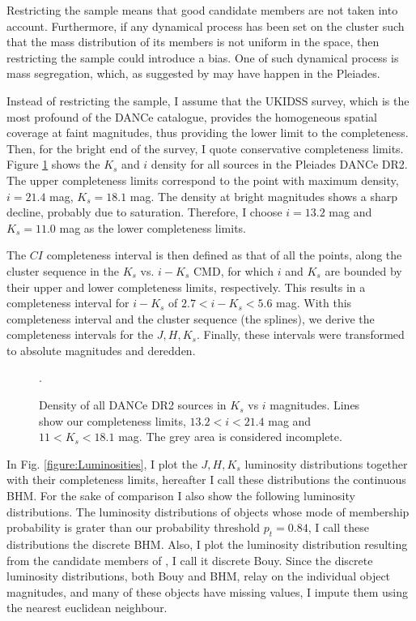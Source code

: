 Restricting the sample means that good candidate members are not taken into account. Furthermore, if any dynamical process has been set on the cluster such that the mass distribution of its members is not uniform in the space, then restricting the sample could introduce a bias. One of such dynamical process is mass segregation, which, as suggested by \citet{Adams2002} may have happen in the Pleiades. 

Instead of restricting the sample, I assume that the UKIDSS survey, which is the most profound of the DANCe catalogue, provides the homogeneous spatial coverage at faint magnitudes, thus providing the lower limit to the completeness. Then, for the bright end of the survey, I quote conservative completeness limits. Figure \ref{figure:completeness} shows the $K_s$ and $i$ density  for all sources in the Pleiades DANCe DR2. The upper completeness limits correspond to the point with maximum density, $i=21.4$ mag, $K_s=18.1$ mag. The density at bright magnitudes shows a sharp decline, probably due to saturation. Therefore, I choose $i=13.2$ mag and $K_s=11.0$ mag as the lower completeness limits.

The $CI$ completeness interval is then defined as that of all the points, along the cluster sequence in the $K_s$ vs. $i-K_s$ CMD, for which $i$ and $K_s$ are bounded by their upper and lower completeness limits, respectively. This results in a completeness interval for $i-K_s$ of  $2.7<i-K_s<5.6$ mag. With this completeness interval and the cluster sequence (the splines), we derive the completeness intervals for the $J,H,K_s$. Finally, these intervals were transformed to absolute magnitudes and deredden. 
\begin{figure}[htbp]
\begin{center}
\caption{Density of all DANCe DR2 sources in $K_s$ vs $i$ magnitudes. Lines show our completeness limits, $13.2<i<21.4$ mag and $11<K_s<18.1$ mag. The grey area is considered incomplete.}
\label{figure:completeness}.
\end{center}
\end{figure}


In Fig. \ref{figure:Luminosities}, I plot the $J,H,K_s$ luminosity distributions together with their completeness limits, hereafter I call these distributions the continuous BHM. For the sake of comparison I also show the following luminosity distributions. The luminosity distributions of objects whose mode of membership probability is grater than our probability threshold $p_t=0.84$, I call these distributions the discrete BHM. Also, I plot the luminosity distribution resulting from the candidate members of \citet{Bouy2015}, I call it discrete Bouy. Since the discrete luminosity distributions, both Bouy and BHM, relay on the individual object magnitudes, and many of these objects have missing values, I impute them using the nearest euclidean neighbour. 

